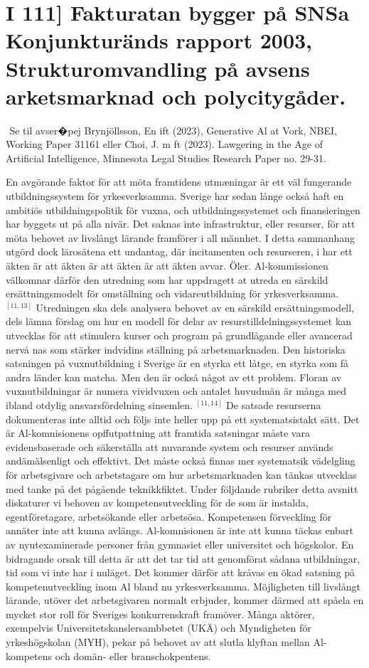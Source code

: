 {{{{{{{{{{{{\section*{I 111] Fakturatan bygger på SNSa Konjunkturänds rapport 2003, Strukturomvandling på avsens arketsmarknad och polycitygåder.}
\({ }^{}\) Se til avser�pej Brynjöllsson, En ift (2023), Generative Al at Vork, NBEI, Working Paper 31161 eller Choi, J. m ft (2023). Lawgering in the Age of Artificial Intelligence, Minnesota Legal Studies Research Paper no. 29-31.

En avgörande faktor för att möta framtidens utmæningar är ett väl fungerande utbildningssystem för yrkesverksamma. Sverige har sedan långe också haft en ambitiös utbildningspolitik för vuxna, och utbildningssystemet och finansieringen har byggets ut på alla nivär. Det saknas inte infrastruktur, eller resurser, för att möta behovet av livslångt lärande framförer i all männhet. I detta sammanhang utgörd dock lärosätena ett undantag, där incitamenten och resurseren, i har ett äkten är att äkten är att äkten är att äkten avvar. Öler. Al-kommissionen välkomnar därför den utredning som har uppdragett at utreda en särskild ersättningsmodelt för omställning och vidareutbildning för yrkesverksamma. \({ }^{[11,13]}\) Utredningen ska dels analysera behovet av en särskild ersättningsmodell, dels lämna förslag om hur en modell för delar av resurstilldelningssystemet kan utvecklas för att stimulera kurser och program på grundlågande eller avancerad nervå nas som stärker indvidins ställning på arbetsmarknaden.
Den historiska satsningen på vuxnutbildning i Sverige är en styrka ett låtge, en styrka som få andra länder kan matcha. Men den är också något av ett problem. Floran av vuxnutbildningar är numera vividvuxen och antalet huvudmän är många med ibland otdylig ansvarsfördelning sinsemlen. \({ }^{[11,14]}\) De satsade resurserna dokumenteras inte alltid och följs inte heller upp på ett systematsistakt sätt. Det är Al-komnisionens opffutpattning att framtida satsningar måste vara evidensbaserade och säkerställa att nuvarande system och resurser används andämälsenligt och effektivt. Det måste också finnas mer systematsik vädelgling för arbetsgivare och arbetstagare om hur arbetsmarknaden kan tänkas utvecklas med tanke på det pågående teknikkfiktet. Under följdande rubriker detta avsnitt diskaturer vi behoven av kompetensutveckling för de som är instalda, egentföretagare, arbetsökande eller arbetsösa.
Kompetensen förveckling för annäter inte att kunna avlängs. Al-komnisionen är inte att kunna täckas enbart av nyutexaminerade personer från gymnasiet eller universitet och högskolor. En bidragande orsak till detta är att det tar tid att genomförat sådana utbildningar, tid som vi inte har i nuläget. Det kommer därför att kråvas en ökad satsning på kompetenutveckling inom Al bland nu yrkesverksamma. Möjligheten till livslångt lärande, utöver det arbetsgivaren normalt erbjuder, kommer därmed att spåela en mycket stor roll för Sveriges konkurrenskraft framöver. Många aktörer, exempelvis Universitetskanslersambbetet (UKÄ) och Myndigheten för yrkeshögskolan (MYH), pekar på behovet av att slutla klyftan mellan Al-kompetens och domän- eller branschokpentens.
}}}}}}}}}}}}
